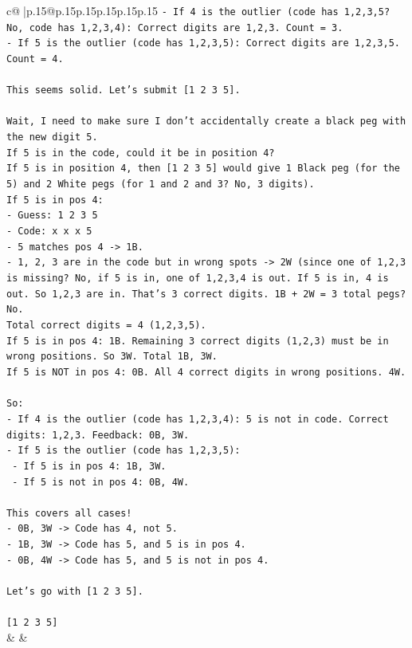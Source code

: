 \documentclass{article}
\begin{document}
{\begin{supertabular}{c@{$\;$}|p{.15\linewidth}@{}p{.15\linewidth}p{.15\linewidth}p{.15\linewidth}p{.15\linewidth}p{.15\linewidth}}
{{{\texttt{{-} If 4 is the outlier (code has 1,2,3,5? No, code has 1,2,3,4): Correct digits are 1,2,3. Count = 3.} \\
\texttt{{-} If 5 is the outlier (code has 1,2,3,5): Correct digits are 1,2,3,5. Count = 4.} \\
\\ 
\texttt{This seems solid. Let's submit {[}1 2 3 5{]}.} \\
\\ 
\texttt{Wait, I need to make sure I don't accidentally create a black peg with the new digit 5.} \\
\texttt{If 5 is in the code, could it be in position 4?} \\
\texttt{If 5 is in position 4, then {[}1 2 3 5{]} would give 1 Black peg (for the 5) and 2 White pegs (for 1 and 2 and 3? No, 3 digits).} \\
\texttt{If 5 is in pos 4:} \\
\texttt{{-} Guess: 1 2 3 5} \\
\texttt{{-} Code: x x x 5} \\
\texttt{{-} 5 matches pos 4 {-}> 1B.} \\
\texttt{{-} 1, 2, 3 are in the code but in wrong spots {-}> 2W (since one of 1,2,3 is missing? No, if 5 is in, one of 1,2,3,4 is out. If 5 is in, 4 is out. So 1,2,3 are in. That's 3 correct digits. 1B + 2W = 3 total pegs? No.} \\
\texttt{Total correct digits = 4 (1,2,3,5).} \\
\texttt{If 5 is in pos 4: 1B. Remaining 3 correct digits (1,2,3) must be in wrong positions. So 3W. Total 1B, 3W.} \\
\texttt{If 5 is NOT in pos 4: 0B. All 4 correct digits in wrong positions. 4W.} \\
\\ 
\texttt{So:} \\
\texttt{{-} If 4 is the outlier (code has 1,2,3,4): 5 is not in code. Correct digits: 1,2,3. Feedback: 0B, 3W.} \\
\texttt{{-} If 5 is the outlier (code has 1,2,3,5):} \\
\texttt{  {-} If 5 is in pos 4: 1B, 3W.} \\
\texttt{  {-} If 5 is not in pos 4: 0B, 4W.} \\
\\ 
\texttt{This covers all cases!} \\
\texttt{{-} 0B, 3W {-}> Code has 4, not 5.} \\
\texttt{{-} 1B, 3W {-}> Code has 5, and 5 is in pos 4.} \\
\texttt{{-} 0B, 4W {-}> Code has 5, and 5 is not in pos 4.} \\
\\ 
\texttt{Let's go with {[}1 2 3 5{]}.} \\
\\ 
\texttt{{[}1 2 3 5{]}} \\
            }
        }
    }
    & & \\ \\


\end{supertabular}}
\end{document}
